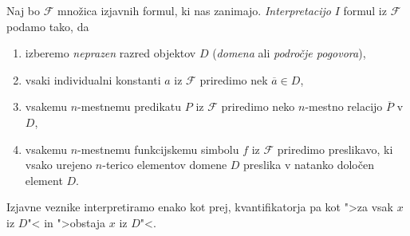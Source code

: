 \documentclass[12pt, a4paper]{article}
\begin{document}
\begin{okvir}
\begin{definicija}
Naj bo $\mathcal{F}$ množica izjavnih formul, ki nas zanimajo. \emph{Interpretacijo} $I$ formul iz $\mathcal{F}$ podamo tako, da

\begin{enumerate}
\item izberemo \emph{neprazen} razred objektov $D$ (\emph{domena} ali \emph{področje pogovora}),
\item vsaki individualni konstanti $a$ iz $\mathcal{F}$ priredimo nek $\overline{a}\in D$,
\item vsakemu $n$-mestnemu predikatu $P$ iz $\mathcal{F}$ priredimo neko $n$-mestno relacijo $\overline{P}$ v $D$,
\item vsakemu $n$-mestnemu funkcijskemu simbolu $f$ iz $\mathcal{F}$ priredimo preslikavo, ki vsako urejeno $n$-terico elementov domene $D$ preslika v natanko določen element $D$.
\end{enumerate}

Izjavne veznike interpretiramo enako kot prej, kvantifikatorja pa kot ">za vsak $x$ iz $D$"< in ">obstaja $x$ iz $D$"<.
\end{definicija}
\end{okvir}
\end{document}
